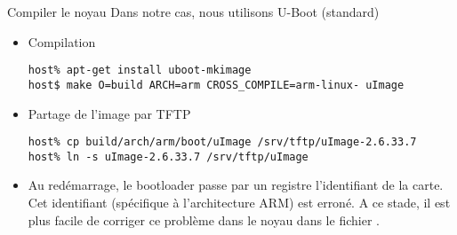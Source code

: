 \begin{frame}[fragile=singleslide]{Compiler le noyau}
  Dans notre cas, nous utilisons U-Boot (standard)
  \begin{itemize}
  \item Compilation
    \begin{lstlisting}
host% apt-get install uboot-mkimage
host$ make O=build ARCH=arm CROSS_COMPILE=arm-linux- uImage
    \end{lstlisting}
  \item Partage de l'image par TFTP
    \begin{lstlisting}
host% cp build/arch/arm/boot/uImage /srv/tftp/uImage-2.6.33.7
host% ln -s uImage-2.6.33.7 /srv/tftp/uImage
    \end{lstlisting} %
  \item  Au   redémarrage,  le   bootloader  passe  par   un  registre
    l'identifiant  de   la  carte.   Cet   identifiant  (spécifique  à
    l'architecture ARM) est erroné. A  ce stade, il est plus facile de
    corriger   ce   problème   dans   le   noyau   dans   le   fichier
    .
  \end{itemize}
\end{frame}

